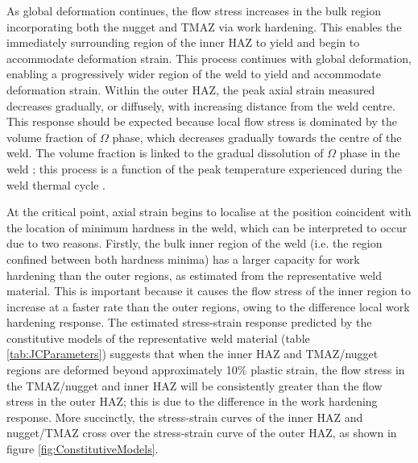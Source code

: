 As global deformation continues, the flow stress increases in the bulk region incorporating both the nugget and TMAZ via work hardening. This enables the immediately surrounding region of the inner HAZ to yield and begin to accommodate deformation strain. This process continues with global deformation, enabling a progressively wider region of the weld to yield and accommodate deformation strain. Within the outer HAZ, the peak axial strain measured decreases gradually, or diffusely, with increasing distance from the weld centre. This response should be expected because local flow stress is dominated by the volume fraction of $\Omega$ phase, which decreases gradually towards the centre of the weld. The volume fraction is linked to the gradual dissolution of $\Omega$ phase in the weld \cite{McWilliams2013,Grujicic2011}; this process is a function of the peak temperature experienced during the weld thermal cycle \cite{Sullivan2011,Robson2006}. 

At the critical point, axial strain begins to localise at the position coincident with the location of minimum hardness in the weld, which can be interpreted to occur due to two reasons. Firstly, the bulk inner region of the weld (i.e. the region confined between both hardness minima) has a larger capacity for work hardening than the outer regions, as estimated from the representative weld material. This is important because it causes the flow stress of the inner region to increase at a faster rate than the outer regions, owing to the difference local work hardening response. The estimated stress-strain response predicted by the constitutive models of the representative weld material (table \ref{tab:JCParameters}) suggests that when the inner HAZ and TMAZ/nugget regions are deformed beyond approximately 10\% plastic strain, the flow stress in the TMAZ/nugget and inner HAZ will be consistently greater than the flow stress in the outer HAZ; this is due to the difference in the work hardening response. More succinctly, the stress-strain curves of the inner HAZ and nugget/TMAZ cross over the stress-strain curve of the outer HAZ, as shown in figure \ref{fig:ConstitutiveModels}.

